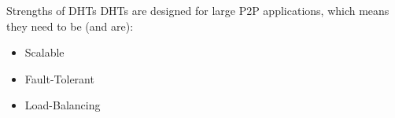 \documentclass[11pt]{beamer}
\begin{document}
%
%

%
%	

\begin{frame}{Strengths of DHTs }
	DHTs are designed for large P2P applications, which means they need to be (and are):
	\begin{itemize}
		\item Scalable
		\item Fault-Tolerant
		\item Load-Balancing
	\end{itemize}
	
\end{frame}
\end{document}

